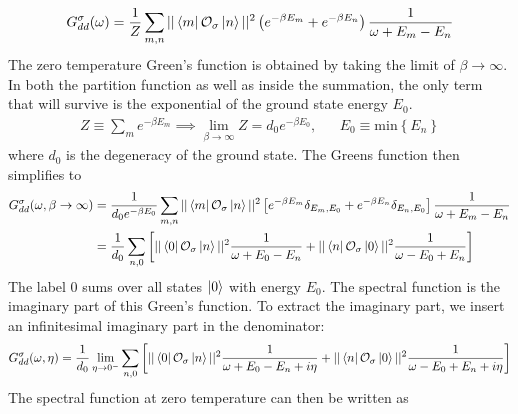 \documentclass[reprint,hidelinks,onecolumn]{revtex4-2}
\begin{document}
\begin{equation}\begin{aligned}
	G_{d d}^\sigma(\omega) = \frac{1}{Z}\sum_{m,n}||\bra{m}\mathcal{O}_{\sigma}\ket{n}||^2\left( e^{-\beta E_m} + e^{-\beta E_n}\right)\frac{1}{\omega + E_m - E_n}
\end{aligned}\end{equation}
The zero temperature Green's function is obtained by taking the limit of \(\beta \to \infty\). In both the partition function as well as inside the summation, the only term that will survive is the exponential of the ground state energy \(E_0\).
\begin{equation*}\begin{aligned}
	Z \equiv \sum_m e^{-\beta E_m} \implies \lim_{\beta \to \infty}Z = d_0 e^{-\beta E_0}, && E_0 \equiv \text{min}\left\{ E_n \right\} 
\end{aligned}\end{equation*}
where \(d_0\) is the degeneracy of the ground state. The Greens function then simplifies to
\begin{equation}\begin{aligned}
	\label{Gf_lk}
	G_{d d}^\sigma(\omega, \beta \to \infty) &= \frac{1}{d_0e^{-\beta E_0}}\sum_{m,n}||\bra{m}\mathcal{O}_{\sigma}\ket{n}||^2\left[e^{-\beta E_m}\delta_{E_m, E_0} + e^{-\beta E_n}\delta_{E_n, E_0}\right]\frac{1}{\omega + E_m - E_n}\\
						 &= \frac{1}{d_0}\sum_{n,0}\left[||\bra{0}\mathcal{O}_{\sigma}\ket{n}||^2\frac{1}{\omega + E_0 - E_n} + ||\bra{n}\mathcal{O}_{\sigma}\ket{0}||^2\frac{1}{\omega - E_0 + E_n}\right]\\
\end{aligned}\end{equation}
The label 0 sums over all states \(\ket{0}\) with energy \(E_0\). The spectral function is the imaginary part of this Green's function. To extract the imaginary part, we insert an infinitesimal imaginary part in the denominator:
\begin{equation}\begin{aligned}
	G_{d d}^\sigma(\omega, \eta) = \frac{1}{d_0}\lim_{\eta \to 0^-}\sum_{n,0}\left[||\bra{0}\mathcal{O}_{\sigma}\ket{n}||^2\frac{1}{\omega + E_0 - E_n + i\eta} + ||\bra{n}\mathcal{O}_{\sigma}\ket{0}||^2\frac{1}{\omega - E_0 + E_n + i\eta}\right]\\
\end{aligned}\end{equation}
The spectral function at zero temperature can then be written as
\end{document}
